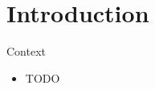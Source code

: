 \section{Introduction}

\begin{frame}{Context}
	\begin{itemize}
		\item \alert{TODO}
	\end{itemize}
\end{frame}